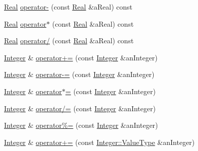 \begin{DoxyCompactItemize}
\item 
\hyperlink{classlibrary_1_1core_1_1types_1_1_real}{Real} \hyperlink{classlibrary_1_1core_1_1types_1_1_integer_acd14824d3ca5530cd8952f3e249e310f}{operator-\/} (const \hyperlink{classlibrary_1_1core_1_1types_1_1_real}{Real} \&a\+Real) const
\item 
\hyperlink{classlibrary_1_1core_1_1types_1_1_real}{Real} \hyperlink{classlibrary_1_1core_1_1types_1_1_integer_a3edc207fd4799cb16eb4075fdd098efb}{operator$\ast$} (const \hyperlink{classlibrary_1_1core_1_1types_1_1_real}{Real} \&a\+Real) const
\item 
\hyperlink{classlibrary_1_1core_1_1types_1_1_real}{Real} \hyperlink{classlibrary_1_1core_1_1types_1_1_integer_a6724d09c95b335402fe3553a13dd725d}{operator/} (const \hyperlink{classlibrary_1_1core_1_1types_1_1_real}{Real} \&a\+Real) const
\item 
\hyperlink{classlibrary_1_1core_1_1types_1_1_integer}{Integer} \& \hyperlink{classlibrary_1_1core_1_1types_1_1_integer_aeadb166badac8d39b41f9a5419dbc1cc}{operator+=} (const \hyperlink{classlibrary_1_1core_1_1types_1_1_integer}{Integer} \&an\+Integer)
\item 
\hyperlink{classlibrary_1_1core_1_1types_1_1_integer}{Integer} \& \hyperlink{classlibrary_1_1core_1_1types_1_1_integer_a006c1d480aa3cd21b2c48693fa3dccf7}{operator-\/=} (const \hyperlink{classlibrary_1_1core_1_1types_1_1_integer}{Integer} \&an\+Integer)
\item 
\hyperlink{classlibrary_1_1core_1_1types_1_1_integer}{Integer} \& \hyperlink{classlibrary_1_1core_1_1types_1_1_integer_a7de90525de769797c765bf6738b0c6c7}{operator$\ast$=} (const \hyperlink{classlibrary_1_1core_1_1types_1_1_integer}{Integer} \&an\+Integer)
\item 
\hyperlink{classlibrary_1_1core_1_1types_1_1_integer}{Integer} \& \hyperlink{classlibrary_1_1core_1_1types_1_1_integer_aaf72e97cae17baba1b2bd216898df8a8}{operator/=} (const \hyperlink{classlibrary_1_1core_1_1types_1_1_integer}{Integer} \&an\+Integer)
\item 
\hyperlink{classlibrary_1_1core_1_1types_1_1_integer}{Integer} \& \hyperlink{classlibrary_1_1core_1_1types_1_1_integer_ac02bfe57c83772f179253b1edd0eb4f5}{operator\%=} (const \hyperlink{classlibrary_1_1core_1_1types_1_1_integer}{Integer} \&an\+Integer)
\item 
\hyperlink{classlibrary_1_1core_1_1types_1_1_integer}{Integer} \& \hyperlink{classlibrary_1_1core_1_1types_1_1_integer_a499066287116e506a750e7a55d390a6d}{operator+=} (const \hyperlink{classlibrary_1_1core_1_1types_1_1_integer_a623afb1580f870fd8a1997b1c12c917d}{Integer\+::\+Value\+Type} \&an\+Integer)

\end{DoxyCompactItemize}
